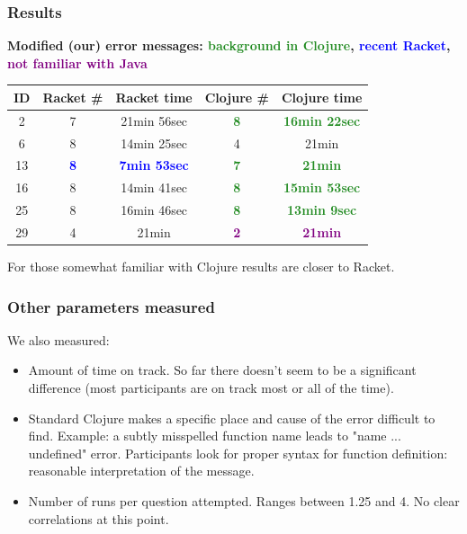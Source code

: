 \documentclass{beamer}
\newcommand{\comment}[1]{{\bf \tt  {#1}}}
\newcommand{\emcomment}[1]{\textcolor{ForestGreen}{\comment{Elena: {#1}}}}
\newcommand{\R}[1]{\textcolor{blue}{\bf {#1}}}
\newcommand{\Cl}[1]{\textcolor{ForestGreen}{\bf {#1}}}
\newcommand{\NoJava}[1]{\textcolor{purple}{\bf {#1}}}
\begin{document}
\begin{frame}
\frametitle{Results}
{\bf Modified (our) error messages:  \Cl{background in Clojure}, \R{recent Racket}, \NoJava{not familiar with Java}}
\vspace{0.1in}

\begin{tabular}{c | c| c| c | c }
\hline
{\bf ID} & {\bf Racket  \#} & {\bf Racket time} & {\bf Clojure  \#} & {\bf Clojure time} \\
\hline 
2 & 7  & 21min 56sec &  \Cl{8} & \Cl{16min 22sec} \\
6 &  8  & 14min 25sec &  4  &  21min \\
13 &  \R{8}  & \R{7min 53sec} &  \Cl{7}  &  \Cl{21min} \\
16 &  8  & 14min 41sec &  \Cl{8}  &  \Cl{15min 53sec} \\
25 &  8  & 16min 46sec &  \Cl{8}  &  \Cl{13min 9sec} \\
29 &  4  & 21min &  \NoJava{2}  & \NoJava{21min} \\
\hline
\end{tabular}
For those somewhat familiar with Clojure results are closer to Racket. 
\end{frame}


\begin{frame}
\frametitle{Other parameters measured}
We also measured:
\begin{itemize}
\item Amount of time on track. So far there doesn't seem to be a significant difference (most participants are on track most or all of the time). 
\item %
Standard Clojure makes a specific place and cause of the error difficult to find. Example: a subtly misspelled function name leads to "name ... undefined" error. Participants  look for proper syntax for function definition: reasonable interpretation of the message. 
\item Number of runs per question attempted. Ranges between 1.25 and 4. No clear correlations at this point. 
\end{itemize}
\end{frame}

\end{document}

